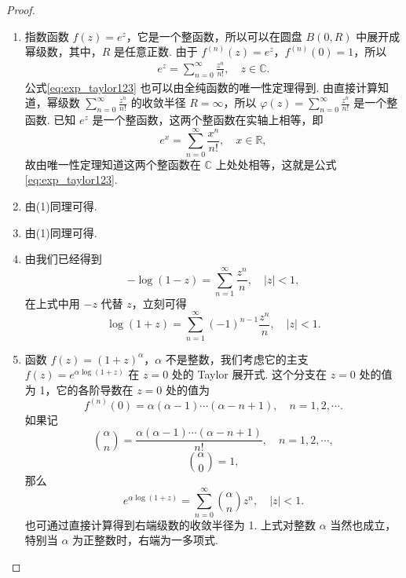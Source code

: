 \documentclass[../../main.tex]{subfiles}
\begin{document}
\begin{proof}
\begin{enumerate}[(1)]
\item 指数函数 \( f(z) = e^z \)，它是一个整函数，所以可以在圆盘 \( B(0,R) \) 中展开成幂级数，其中，\( R \) 是任意正数. 由于 \( f^{(n)}(z) = e^z \)，\( f^{(n)}(0) = 1 \)，所以
\begin{align}
e^z = \sum_{n=0}^{\infty} \frac{z^n}{n!}, \quad z \in \mathbb{C}. \label{eq:exp_taylor123}
\end{align}
公式\eqref{eq:exp_taylor123} 也可以由全纯函数的唯一性定理得到. 由直接计算知道，幂级数 \( \sum_{n=0}^{\infty} \frac{z^n}{n!} \) 的收敛半径 \( R = \infty \)，所以 \( \varphi(z) = \sum_{n=0}^{\infty} \frac{z^n}{n!} \) 是一个整函数. 已知 \( e^z \) 是一个整函数，这两个整函数在实轴上相等，即
\[
e^x = \sum_{n=0}^{\infty} \frac{x^n}{n!}, \quad x \in \mathbb{R},
\]
故由唯一性定理知道这两个整函数在 \( \mathbb{C} \) 上处处相等，这就是公式 \eqref{eq:exp_taylor123}.

\item 由(1)同理可得.

\item 由(1)同理可得.

\item 由我们已经得到
\[
- \log(1 - z) = \sum_{n=1}^{\infty} \frac{z^n}{n}, \quad |z| < 1,
\]
在上式中用 \( -z \) 代替 \( z \)，立刻可得
\[
\log(1 + z) = \sum_{n=1}^{\infty} (-1)^{n - 1} \frac{z^n}{n}, \quad |z| < 1.
\]

\item 函数 \( f(z) = (1 + z)^{\alpha} \)，\( \alpha \) 不是整数，我们考虑它的主支 \( f(z) = e^{\alpha \log(1 + z)} \) 在 \( z = 0 \) 处的 Taylor 展开式. 这个分支在 \( z = 0 \) 处的值为 1，它的各阶导数在 \( z = 0 \) 处的值为
\[
f^{(n)}(0) = \alpha(\alpha - 1) \cdots (\alpha - n + 1), \quad n = 1, 2, \cdots.
\]
如果记
\[
\binom{\alpha}{n} = \frac{\alpha(\alpha - 1) \cdots (\alpha - n + 1)}{n!}, \quad n = 1, 2, \cdots,
\]
\[
\binom{\alpha}{0} = 1,
\]
那么
\[
e^{\alpha \log(1 + z)} = \sum_{n=0}^{\infty} \binom{\alpha}{n} z^n, \quad |z| < 1.
\]
也可通过直接计算得到右端级数的收敛半径为 1. 上式对整数 \( \alpha \) 当然也成立，特别当 \( \alpha \) 为正整数时，右端为一多项式.
\end{enumerate}
\end{proof}
\end{document}
